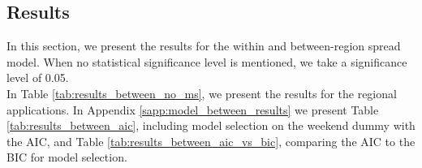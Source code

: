 \documentclass[12pt]{article}
\begin{document}
	\subsection{Results} \label{subsec:model_between_results}
	In this section, we present the results for the within and between-region spread model. When no statistical significance level is mentioned, we take a significance level of 0.05. \\
	
	In Table \ref{tab:results_between_no_ms}, we present the results for the regional applications. In Appendix \ref{sapp:model_between_results} we present Table \ref{tab:results_between_aic}, including model selection on the weekend dummy with the AIC, and Table \ref{tab:results_between_aic_vs_bic}, comparing the AIC to the BIC for model selection.
	
\end{document}
